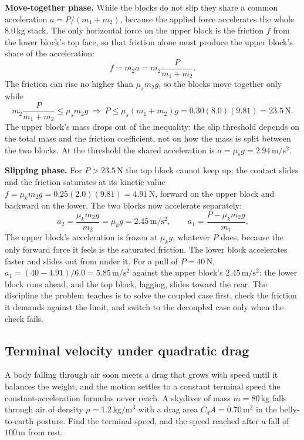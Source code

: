 \textbf{Move-together phase.} While the blocks do not slip they share a
common acceleration $a=P/(m_{1}+m_{2})$, because the applied force
accelerates the whole $8.0\,\si{\kilogram}$ stack. The only horizontal
force on the upper block is the friction $f$ from the lower block's top
face, so that friction alone must produce the upper block's share of the
acceleration:
\[
f=m_{2}a=m_{2}\frac{P}{m_{1}+m_{2}}.
\]
The friction can rise no higher than $\mu_{s}m_{2}g$, so the blocks move
together only while
\[
m_{2}\frac{P}{m_{1}+m_{2}}\le\mu_{s}m_{2}g
\ \Rightarrow\
P\le\mu_{s}(m_{1}+m_{2})g=0.30(8.0)(9.81)=23.5\,\si{\newton}.
\]
The upper block's mass drops out of the inequality: the slip threshold
depends on the total mass and the friction coefficient, not on how the
mass is split between the two blocks. At the threshold the shared
acceleration is $a=\mu_{s}g=2.94\,\si{\meter\per\second\squared}$.

\textbf{Slipping phase.} For $P>23.5\,\si{\newton}$ the top block cannot
keep up; the contact slides and the friction saturates at its kinetic
value $f=\mu_{k}m_{2}g=0.25(2.0)(9.81)=4.91\,\si{\newton}$, forward on
the upper block and backward on the lower. The two blocks now accelerate
separately:
\[
a_{2}=\frac{\mu_{k}m_{2}g}{m_{2}}=\mu_{k}g=2.45\,\si{\meter\per\second
\squared},\qquad
a_{1}=\frac{P-\mu_{k}m_{2}g}{m_{1}}.
\]
The upper block's acceleration is frozen at $\mu_{k}g$, whatever $P$
does, because the only forward force it feels is the saturated friction.
The lower block accelerates faster and slides out from under it. For a
pull of $P=40\,\si{\newton}$, $a_{1}=(40-4.91)/6.0=5.85\,\si{\meter\per
\second\squared}$ against the upper block's $2.45\,\si{\meter\per\second
\squared}$: the lower block runs ahead, and the top block, lagging,
slides toward the rear. The discipline the problem teaches is to solve
the coupled case first, check the friction it demands against the limit,
and switch to the decoupled case only when the check fails.



\subsection{Terminal velocity under quadratic drag}

A body falling through air soon meets a drag that grows with speed until
it balances the weight, and the motion settles to a constant terminal
speed the constant-acceleration formulas never reach. A skydiver of
mass $m=80\,\si{\kilogram}$ falls through air of density $\rho=1.2\,\si{
\kilogram\per\meter\cubed}$ with a drag area $C_{d}A=0.70\,\si{\meter
\squared}$ in the belly-to-earth posture. Find the terminal speed, and
the speed reached after a fall of $100\,\si{\meter}$ from rest.

